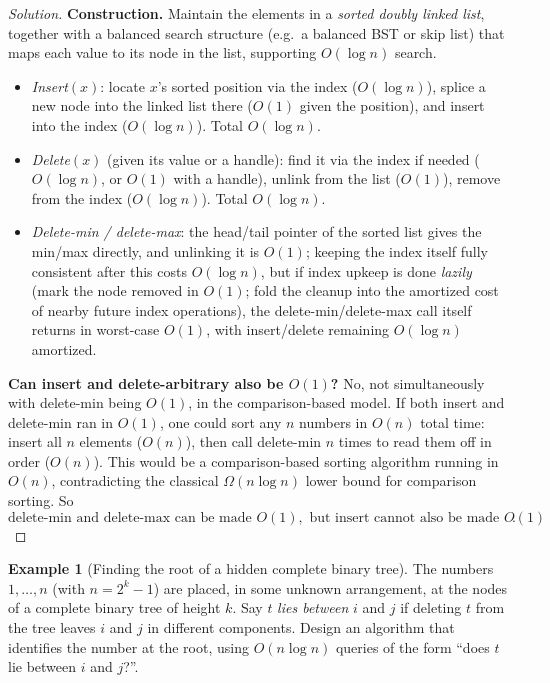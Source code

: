 \documentclass[11pt]{article}
\theoremstyle{definition}
\newtheorem{example}{Example}[section]
\begin{document}
\begin{proof}[Solution]
\textbf{Construction.} Maintain the elements in a \emph{sorted doubly linked list}, together with a balanced search structure (e.g.\ a balanced BST or skip list) that maps each value to its node in the list, supporting $O(\log n)$ search.
\begin{itemize}
\item \emph{Insert}$(x)$: locate $x$'s sorted position via the index ($O(\log n)$), splice a new node into the linked list there ($O(1)$ given the position), and insert into the index ($O(\log n)$). Total $O(\log n)$.
\item \emph{Delete}$(x)$ (given its value or a handle): find it via the index if needed ($O(\log n)$, or $O(1)$ with a handle), unlink from the list ($O(1)$), remove from the index ($O(\log n)$). Total $O(\log n)$.
\item \emph{Delete-min / delete-max}: the head/tail pointer of the sorted list gives the min/max directly, and unlinking it is $O(1)$; keeping the index itself fully consistent after this costs $O(\log n)$, but if index upkeep is done \emph{lazily} (mark the node removed in $O(1)$; fold the cleanup into the amortized cost of nearby future index operations), the delete-min/delete-max call itself returns in worst-case $O(1)$, with insert/delete remaining $O(\log n)$ amortized.
\end{itemize}

\textbf{Can insert and delete-arbitrary also be $O(1)$?} No, not simultaneously with delete-min being $O(1)$, in the comparison-based model. If both insert and delete-min ran in $O(1)$, one could sort any $n$ numbers in $O(n)$ total time: insert all $n$ elements ($O(n)$), then call delete-min $n$ times to read them off in order ($O(n)$). This would be a comparison-based sorting algorithm running in $O(n)$, contradicting the classical $\Omega(n\log n)$ lower bound for comparison sorting. So
\[
\boxed{\text{delete-min and delete-max can be made } O(1), \text{ but insert cannot also be made } O(1)}.
\]
\end{proof}

\begin{example}[Finding the root of a hidden complete binary tree]
The numbers $1,\dots,n$ (with $n=2^k-1$) are placed, in some unknown arrangement, at the nodes of a complete binary tree of height $k$. Say $t$ \emph{lies between} $i$ and $j$ if deleting $t$ from the tree leaves $i$ and $j$ in different components. Design an algorithm that identifies the number at the root, using $O(n\log n)$ queries of the form ``does $t$ lie between $i$ and $j$?''.
\end{example}
\end{document}
